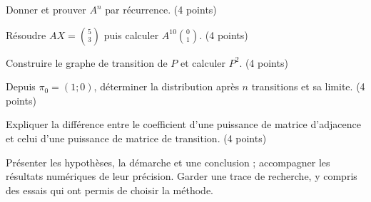 \begin{questions}
\item Donner et prouver $A^n$ par récurrence. \hfill(4 points)
\item Résoudre $AX=\binom53$ puis calculer $A^{10}\binom01$. \hfill(4 points)
\item Construire le graphe de transition de $P$ et calculer $P^2$. \hfill(4 points)
\item Depuis $\pi_0=(1;0)$, déterminer la distribution après $n$ transitions et sa limite. \hfill(4 points)
\item Expliquer la différence entre le coefficient d’une puissance de matrice d’adjacence et celui d’une puissance de matrice de transition. \hfill(4 points)
\end{questions}
\vspace{5mm}\noindent Présenter les hypothèses, la démarche et une conclusion ; accompagner les résultats numériques de leur précision. Garder une trace de recherche, y compris des essais qui ont permis de choisir la méthode.\par\vfill{}\par\vspace{2mm}\noindent{}
\clearpage\endgroup